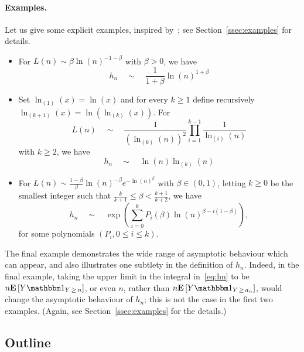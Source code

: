\documentclass[AHL,Unicode,longabstracts,published]{cedram}
\newcommand{\E}[1]{{\mathbf E}\left[#1\right]}
\newcommand{\I}[1]{{\mathbbm 1}_{#1}}
\begin{document}
\paragraph{{Examples.}} Let us give some explicit examples, inspired by~\cite{NW07}; see Section~\ref{ssec:examples} for details.
\begin{itemize}
\item For $L(n) \sim \beta \ln(n)^{-1-\beta}$ with $\beta>0$, we have
\[
h_{n} \quad \sim \quad \frac{1}{1+\beta} \ln(n)^{1+\beta}
\]

\item Set $\ln_{(1)}(x)=\ln(x)$ and for every $k \geq 1$ define recursively $\ln_{(k+1)} (x) = \ln(\ln_{(k)}(x))$. For
\[
L(n) \quad \sim \quad \frac{1}{(\ln_{(k)}(n))^{2}} \prod_{i=1}^{k-1} \frac{1}{\ln_{(i)}(n) }
\]
with $k \geq 2$, we have
\[
h_{n} \quad \sim \quad \ln(n) \ln_{(k)}(n)
\]

\item For $L(n) \sim \frac{1-\beta}{\beta} \ln(n)^{-\beta} e^{-\ln(n)^{\beta}} $ with $\beta \in (0,1)$, letting $k \geq 0$ be the smallest integer such that $ \frac{k}{k+1} \leq \beta < \frac{k+1}{k+2}$, we have
\[
h_{n} \quad \sim \quad \exp \left(\sum_{i=0}^{k} P_{i}(\beta) \ln(n)^{\beta-i(1-\beta)} \right),
\]
for some polynomials $(P_i,0 \le i \le k)$.
\end{itemize}
The final example demonstrates the wide range of asymptotic behaviour which can appear, and also illustrates one subtlety in the definition of $h_n$. Indeed, in the final example, taking the upper limit in the integral in~\eqref{eq:hn} to be $n \E{Y\I{Y\,\ge\, n}}$, or even $n$, rather than $n \E{Y\I{Y\,\ge\,a_n}}$, would change the asymptotic behaviour of $h_n$; this is not the case in the first two examples. (Again, see Section~\ref{ssec:examples} for the details.)

\subsection*{Outline}
\end{document}
